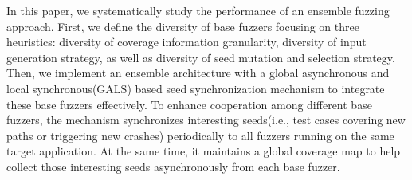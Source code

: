 \begin{comment}
The theory of ensemble learning \cite{zhou2015ensemble} proves that the generalization ability of an ensemble learner is usually much stronger than that of base learners \cite{hansen1990neural, schapire1990strength}. Similarly, we propose the idea of ensemble fuzzing, 
which intuitively helps in the following two aspects: \textit{robustness}, i.e. the consistent advantage on any application in the evaluation setup; \textit{performance}, i.e. achieving better metrics than any other fuzzers under the same resources constraint.

To demonstrate the effectiveness of an ensemble fuzzing, we need to deal with two main challenges before implementation:

\begin{itemize}
   \item [1.] \emph{Base Fuzzer Selection.} Base fuzzers are the underlying basics, and the diversity of base fuzzers is crucial to an ensemble fuzzer. The more diversity of these base fuzzers, the better the ensemble fuzzer performs. 
   \item [2.] \emph{Ensemble Architecture Design.} The architecture determines the effectiveness of ensemble fuzzing. The concrete ensemble architecture should be well designed, because a ensemble method should effectively combines these existing base fuzzers into a stronger ensemble fuzzer. 
\end{itemize}

To our best knowledge, we are the first to propose an ensemble fuzzing approach which we refer as \EnFuzz. 

\end{comment}

In this paper, we systematically study the performance of an ensemble fuzzing approach.
First, we define the diversity of base fuzzers focusing on three heuristics: diversity of coverage information granularity, diversity of input generation strategy, as well as diversity of seed mutation and selection strategy. 
Then, we implement an ensemble architecture with a global asynchronous and local synchronous(GALS) based seed synchronization mechanism to integrate these base fuzzers effectively.
To enhance cooperation among different base fuzzers, the mechanism synchronizes interesting seeds(i.e., test cases covering new paths or triggering new crashes) periodically to all fuzzers running on the same target application. At the same time, it maintains a global coverage map to help collect those interesting seeds asynchronously from each base fuzzer. %

